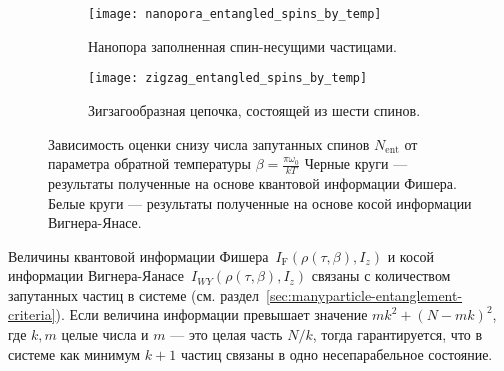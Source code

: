 %

\begin{figure}[H]
  \centering
  \begin{subfigure}[t]{0.49\textwidth}
    \texttt{[image: nanopora\_entangled\_spins\_by\_temp]}
	\caption{
		Нанопора заполненная спин-несущими частицами.
	}
	\label{fig:qfi-wyi-comparison-nanopora}
  \end{subfigure}
  \hfill
  \begin{subfigure}[t]{0.49\textwidth}
    \texttt{[image: zigzag\_entangled\_spins\_by\_temp]}
	\caption{
		Зигзагообразная цепочка, состоящей из шести спинов.
	}
	\label{fig:qfi-wyi-comparison-zigzag-chain}
  \end{subfigure}
  \caption{
    Зависимость оценки снизу числа запутанных спинов  $N_\mathrm{ent}$
	от параметра обратной температуры $\beta = \frac{\pi \omega_0}{kT}$
	Черные круги --- результаты полученные на основе квантовой информации Фишера.
	Белые круги --- результаты полученные на основе косой информации Вигнера-Янасе.
  }
  \label{fig:qfi-wyi-comparison}
\end{figure}

Величины квантовой информации Фишера~$I_\mathrm{F}(\rho(\tau,\beta),I_z)$ и косой информации Вигнера-Яанасе~$I_{WY}(\rho(\tau,\beta),I_z)$
связаны с количеством запутанных частиц в системе (см. раздел~\ref{sec:manyparticle-entanglement-criteria}).
Если величина информации превышает значение $mk^2 + (N - mk)^2$,
где $k, m$ целые числа и $m$ --- это целая часть $N/k$,
тогда гарантируется,
что в системе как минимум $k+1$ частиц связаны в одно несепарабельное состояние.


